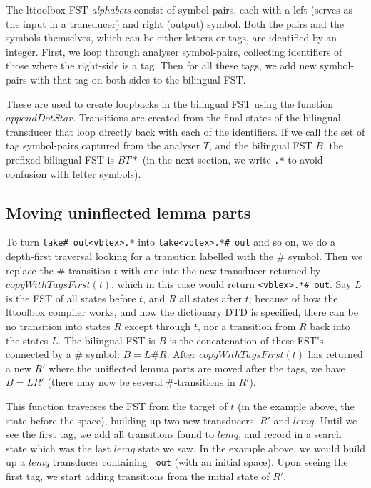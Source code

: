 \documentclass[10pt, a4paper]{article}
\newcommand{\ana}[1]{\texttt{#1}}
\begin{document}
The lttoolbox FST \emph{alphabets} consist of symbol pairs, each with
a left (serves as the input in a transducer) and right (output)
symbol. Both the pairs and the symbols themselves, which can be either
letters or tags, are identified by an integer. First, we loop through
analyser symbol-pairs, collecting identifiers of those where the
right-side is a tag. Then for all these tags, we add new symbol-pairs
with that tag on both sides to the bilingual FST.

These are used to create loopbacks in the bilingual FST using the
function $appendDotStar$. Transitions are created from the final
states of the bilingual transducer that loop directly back with each
of the identifiers. If we call the set of tag symbol-pairs captured
from the analyser $T$, and the bilingual FST $B$, the prefixed
bilingual FST is $B T*$ (in the next section, we write \ana{.*} to
avoid confusion with letter symbols).

\subsection{Moving uninflected lemma parts}
\label{sec:lemqmove}

To turn \ana{take\# out<vblex>.*} into \ana{take<vblex>.*\# out} and
so on, we do a depth-first traversal looking for a transition labelled
with the \# symbol. Then we replace the \#-transition $t$ with one
into the new transducer returned by $copyWithTagsFirst(t)$, which in
this case would return \ana{<vblex>.*\# out}. Say $L$ is the FST of
all states before $t$, and $R$ all states after $t$; because of how
the lttoolbox compiler works, and how the dictionary DTD is specified,
there can be no transition into states $R$ except through $t$, nor a
transition from $R$ back into the states $L$. The bilingual FST is $B$
is the concatenation of these FST's, connected by a \# symbol: $B = L
\# R$. After $copyWithTagsFirst(t)$ has returned a new $R'$ where the
uniflected lemma parts are moved after the tags, we have $B = L R'$
(there may now be several \#-transitions in $R'$).

This function traverses the FST from the target of $t$ (in the example
above, the state before the space), building up two new transducers,
$R'$ and $lemq$. Until we see the first tag, we add all transitions
found to $lemq$, and record in a search state which was the last
$lemq$ state we saw. In the example above, we would build up a $lemq$
transducer containing \ana{ out} (with an initial space). Upon seeing
the first tag, we start adding transitions from the initial state of
$R'$.
\end{document}
